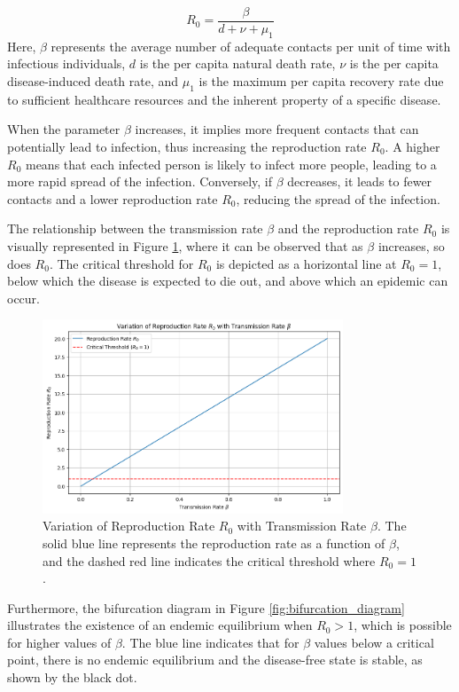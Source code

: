 \begin{itemize}
\[
R_0 = \frac{\beta}{d + \nu + \mu_1}
\]
Here, \( \beta \) represents the average number of adequate contacts per unit of time with infectious individuals, \( d \) is the per capita natural death rate, \( \nu \) is the per capita disease-induced death rate, and \( \mu_1 \) is the maximum per capita recovery rate due to sufficient healthcare resources and the inherent property of a specific disease.

When the parameter \( \beta \) increases, it implies more frequent contacts that can potentially lead to infection, thus increasing the reproduction rate \( R_0 \). A higher \( R_0 \) means that each infected person is likely to infect more people, leading to a more rapid spread of the infection. Conversely, if \( \beta \) decreases, it leads to fewer contacts and a lower reproduction rate \( R_0 \), reducing the spread of the infection.

The relationship between the transmission rate \( \beta \) and the reproduction rate \( R_0 \) is visually represented in Figure \ref{fig:reproduction_rate}, where it can be observed that as \( \beta \) increases, so does \( R_0 \). The critical threshold for \( R_0 \) is depicted as a horizontal line at \( R_0 = 1 \), below which the disease is expected to die out, and above which an epidemic can occur.

\begin{figure}[H]
\centering
\includegraphics[width=0.8\textwidth]{images/task5/ex4_t5_5_1.png}
\caption{Variation of Reproduction Rate \( R_0 \) with Transmission Rate \( \beta \). The solid blue line represents the reproduction rate as a function of \( \beta \), and the dashed red line indicates the critical threshold where \( R_0 = 1 \).}
\label{fig:reproduction_rate}
\end{figure}

Furthermore, the bifurcation diagram in Figure \ref{fig:bifurcation_diagram} illustrates the existence of an endemic equilibrium when \( R_0 > 1 \), which is possible for higher values of \( \beta \). The blue line indicates that for \( \beta \) values below a critical point, there is no endemic equilibrium and the disease-free state is stable, as shown by the black dot.


\end{itemize}
